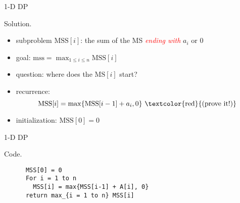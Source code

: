 \begin{frame}{1-D DP}
  \begin{block}{Solution.}
    \begin{itemize}
      \item subproblem $\text{MSS}[i]$: the sum of the MS \textcolor{red}{\it ending with} $a_{i}$ or 0
      \item goal: $\text{mss} = \max_{1 \le i \le n} \text{MSS}[i]$
      \item<2-> question: where does the $\text{MS}[i]$ start?
      \item<2-> recurrence: 
	\[ 
	  \text{MSS}[i] = \max \set{\text{MSS}[i-1] + a_{i}, 0} \text{ \textcolor{red}{(prove it!)}}
	\]
      \item<3-> initialization: $\text{MSS}[0] = 0$
    \end{itemize}

  \end{block}
\end{frame}
\begin{frame}[fragile]{1-D DP}
  \begin{block}{Code.}
    \begin{verbatim}
      MSS[0] = 0
      For i = 1 to n
        MSS[i] = max{MSS[i-1] + A[i], 0}
      return max_{i = 1 to n} MSS[i]
    \end{verbatim}
  \end{block}

\end{frame}
